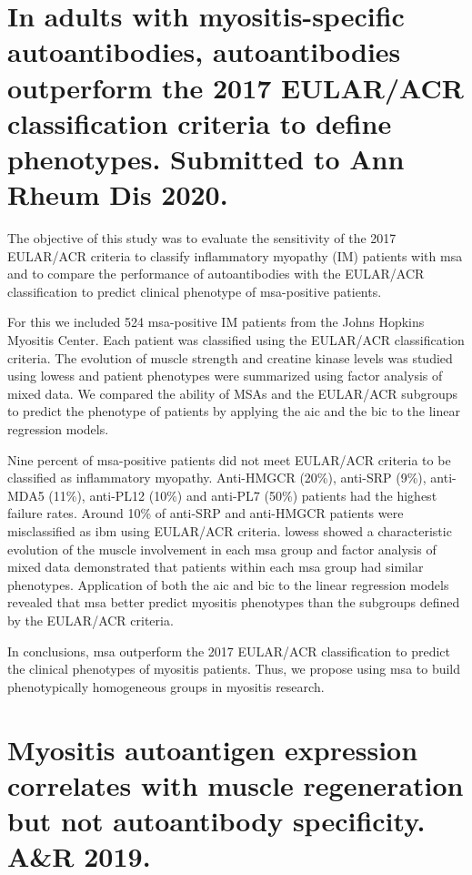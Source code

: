 

\section{In adults with myositis-specific autoantibodies, autoantibodies outperform the 2017 EULAR/ACR classification criteria to define phenotypes. Submitted to Ann Rheum Dis 2020.}
\label{sec:atb_class}

The objective of this study was to evaluate the sensitivity of the 2017 EULAR/ACR criteria to classify inflammatory myopathy (IM) patients with \gls{msa} and to compare the performance of autoantibodies with the EULAR/ACR classification to predict clinical phenotype of \gls{msa}-positive patients.

For this we included 524 \gls{msa}-positive IM patients from the Johns Hopkins Myositis Center. Each patient was classified using the EULAR/ACR classification criteria. The evolution of muscle strength and creatine kinase levels was studied using \gls{lowess} and patient phenotypes were summarized using factor analysis of mixed data. We compared the ability of MSAs and the EULAR/ACR subgroups to predict the phenotype of patients by applying the \gls{aic} and the \gls{bic} to the linear regression models.

Nine percent of \gls{msa}-positive patients did not meet EULAR/ACR criteria to be classified as inflammatory myopathy. Anti-HMGCR (20\%), anti-SRP (9\%), anti-MDA5 (11\%), anti-PL12 (10\%) and anti-PL7 (50\%) patients had the highest failure rates. Around 10\% of anti-SRP and anti-HMGCR patients were misclassified as \gls{ibm} using EULAR/ACR criteria. \gls{lowess} showed a characteristic evolution of the muscle involvement in each \gls{msa} group and factor analysis of mixed data demonstrated that patients within each \gls{msa} group had similar phenotypes. Application of both the \gls{aic} and \gls{bic} to the linear regression models revealed that \gls{msa} better predict myositis phenotypes than the subgroups defined by the EULAR/ACR criteria.

In conclusions, \gls{msa} outperform the 2017 EULAR/ACR classification to predict the clinical phenotypes of myositis patients. Thus, we propose using \gls{msa} to build phenotypically homogeneous groups in myositis research.



\section{Myositis autoantigen expression correlates with muscle regeneration but not autoantibody specificity. A\&R 2019.}
\label{sec:autoantigens}

